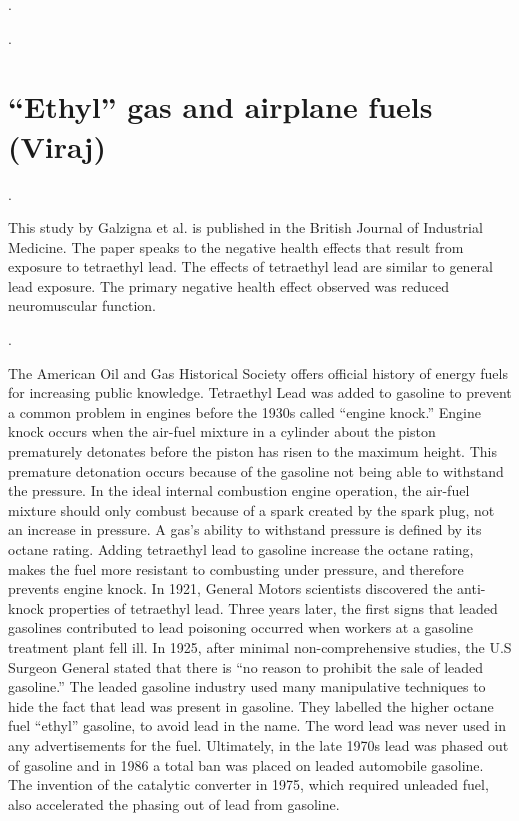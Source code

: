 \documentclass{article}
\begin{document}
.

\medskip

.

\medskip

\section{``Ethyl'' gas and airplane fuels (Viraj)}


\bigskip
\noindent {}.
\medskip

This study by Galzigna et al. is published in the British Journal of Industrial Medicine. The paper speaks to the negative health effects that result from exposure to tetraethyl lead. The effects of tetraethyl lead are similar to general lead exposure. The primary negative health effect observed was reduced neuromuscular function.

\bigskip

\noindent {}.
\medskip

The American Oil and Gas Historical Society offers official history of energy fuels for increasing public knowledge. Tetraethyl Lead was added to gasoline to prevent a common problem in engines before the 1930s called “engine knock.” Engine knock occurs when the air-fuel mixture in a cylinder about the piston prematurely detonates before the piston has risen to the maximum height. This premature detonation occurs because of the gasoline not being able to withstand the pressure. In the ideal internal combustion engine operation, the air-fuel mixture should only combust because of a spark created by the spark plug, not an increase in pressure. A gas’s ability to withstand pressure is defined by its octane rating. Adding tetraethyl lead to gasoline increase the octane rating, makes the fuel more resistant to combusting under pressure, and therefore prevents engine knock. In 1921, General Motors scientists discovered the anti-knock properties of tetraethyl lead. Three years later, the first signs that leaded gasolines contributed to lead poisoning occurred when workers at a gasoline treatment plant fell ill. In 1925, after minimal non-comprehensive studies, the U.S Surgeon General stated that there is “no reason to prohibit the sale of leaded gasoline.” The leaded gasoline industry used many manipulative techniques to hide the fact that lead was present in gasoline. They labelled the higher octane fuel “ethyl” gasoline, to avoid lead in the name. The word lead was never used in any advertisements for the fuel. Ultimately, in the late 1970s lead was phased out of gasoline and in 1986 a total ban was placed on leaded automobile gasoline. The invention of the catalytic converter in 1975, which required unleaded fuel, also accelerated the phasing out of lead from gasoline. 
\end{document}

